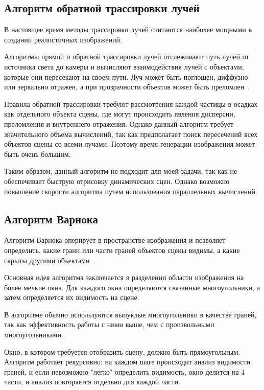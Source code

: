 \subsection{Алгоритм обратной трассировки лучей}

В настоящее время методы трассировки лучей считаются наиболее мощными в создании реалистичных изображений.

Алгоритмы прямой и обратной трассировки лучей отслеживают путь лучей от источника света до камеры и вычисляют взаимодействия лучей с объектами, которые они пересекают на своем пути. Луч может быть поглощен, диффузно или зеркально отражен, а при прозрачности объектов может быть преломлен~\cite{roders}.

Правила обратной трассировки требуют рассмотрения каждой частицы в осадках как отдельного объекта сцены, где могут происходить явления дисперсии, преломления и внутреннего отражения. Однако данный алгоритм требует значительного объема вычислений, так как предполагает поиск пересечений всех объектов сцены со всеми лучами. Поэтому время генерации изображения может быть очень большим.

Таким образом, данный алгоритм не подходит для моей задачи, так как не обеспечивает быструю отрисовку динамических сцен. Однако возможно повышение скорости алгоритма путем использования параллельных вычислений.

\subsection{Алгоритм Варнока}

Алгоритм Варнока оперирует в пространстве изображения и позволяет определить, какие грани или части граней объектов сцены видимы, а какие скрыты другими объектами~\cite{roders}.

Основная идея алгоритма заключается в разделении области изображения на более мелкие окна. Для каждого окна определяются связанные многоугольники, а затем определяется их видимость на сцене.

В алгоритме обычно используются выпуклые многоугольники в качестве граней, так как эффективность работы с ними выше, чем с произвольными многоугольниками.

Окно, в котором требуется отобразить сцену, должно быть прямоугольным. Алгоритм работает рекурсивно: на каждом шаге происходит анализ видимости граней, и если невозможно "легко" определить видимость, окно делится на 4 части, и анализ повторяется отдельно для каждой части.

